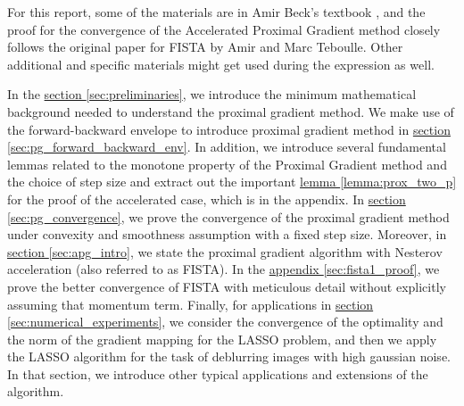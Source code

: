 \documentclass[]{article}
\theoremstyle{definition}
\begin{document}
    \par
    For this report, some of the materials are in Amir Beck's textbook \cite{book:first_order_opt}, and the proof for the convergence of the Accelerated Proximal Gradient method closely follows the original paper for FISTA\cite{paper:FISTA} by Amir and Marc Teboulle. Other additional and specific materials might get used during the expression as well. 
    \par 
    In the \hyperref[sec:preliminaries]{section \ref*{sec:preliminaries}}, we introduce the minimum mathematical background needed to understand the proximal gradient method. We make use of the forward-backward envelope to introduce proximal gradient method in \hyperref[sec:pg_forward_backward_env]{section \ref*{sec:pg_forward_backward_env}}. In addition, we introduce several fundamental lemmas related to the monotone property of the Proximal Gradient method and the choice of step size and extract out the important \hyperref[lemma:prox_two_p]{lemma \ref*{lemma:prox_two_p}} for the proof of the accelerated case, which is in the appendix. In \hyperref[sec:pg_convergence]{section \ref*{sec:pg_convergence}}, we prove the convergence of the proximal gradient method under convexity and smoothness assumption with a fixed step size. Moreover, in \hyperref[sec:apg_intro]{section \ref*{sec:apg_intro}}, we state the proximal gradient algorithm with Nesterov acceleration (also referred to as FISTA). In the \hyperref[alg:fista_1]{appendix \ref*{sec:fista1_proof}}, we prove the better convergence of FISTA with meticulous detail without explicitly assuming that momentum term. Finally, for applications in \hyperref[sec:numerical_experiments]{section \ref*{sec:numerical_experiments}}, we consider the convergence of the optimality and the norm of the gradient mapping for the LASSO problem, and then we apply the LASSO algorithm for the task of deblurring images with high gaussian noise. In that section, we introduce other typical applications and extensions of the algorithm. 
\end{document}
